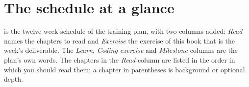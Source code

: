\section{The schedule at a glance}
\label{sec:appA-schedule}

 is the twelve-week schedule of the training plan, with two columns
added: \emph{Read} names the chapters to read and \emph{Exercise} the exercise of this book
that is the week's deliverable. The \emph{Learn}, \emph{Coding exercise} and
\emph{Milestone} columns are the plan's own words. The chapters in the \emph{Read} column
are listed in the order in which you should read them; a chapter in parentheses is
background or optional depth.

